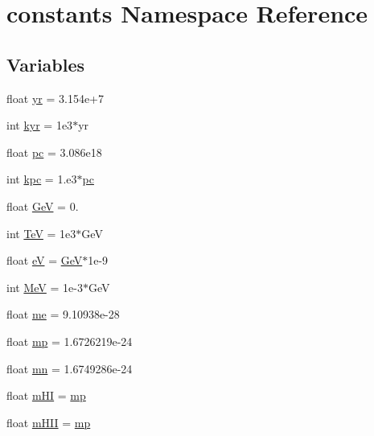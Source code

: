 \hypertarget{namespaceconstants}{}\section{constants Namespace Reference}
\label{namespaceconstants}
\subsection*{Variables}
\begin{DoxyCompactItemize}
\item 
float \hyperlink{namespaceconstants_a14d775b1c17d869c0f0d447f0bfc9330}{yr} = 3.\+154e+7
\item 
int \hyperlink{namespaceconstants_ab5bb5ac138ecb54ccd663804b1c3ab9c}{kyr} = 1e3$\ast$yr
\item 
float \hyperlink{namespaceconstants_a93c63f6ed8c5e300d378f5e4007f9b6d}{pc} = 3.\+086e18
\item 
int \hyperlink{namespaceconstants_ad91def68fa6a3afee415cc69061a7583}{kpc} = 1.e3$\ast$\hyperlink{namespaceconstants_a93c63f6ed8c5e300d378f5e4007f9b6d}{pc}
\item 
float \hyperlink{namespaceconstants_ae15025e47a0397f98ad31918b0c426d4}{GeV} = 0.
\item 
int \hyperlink{namespaceconstants_acfeca3926802be06862b690861b75547}{TeV} = 1e3$\ast$\+GeV
\item 
float \hyperlink{namespaceconstants_a93953cf99166a4a0b70cf2daf5d08be5}{eV} = \hyperlink{namespaceconstants_ae15025e47a0397f98ad31918b0c426d4}{GeV}$\ast$1e-\/9
\item 
int \hyperlink{namespaceconstants_a833162acb0cb16acebd5e3379bb4ab4d}{MeV} = 1e-\/3$\ast$\+GeV
\item 
float \hyperlink{namespaceconstants_a5103d84ddd0c3eff4199593db0a5d88d}{me} = 9.\+10938e-\/28
\item 
float \hyperlink{namespaceconstants_aebdc70445dfb9e72960792ba2efe97ab}{mp} = 1.\+6726219e-\/24
\item 
float \hyperlink{namespaceconstants_ad53f198771c37114065171d857217e26}{mn} = 1.\+6749286e-\/24
\item 
float \hyperlink{namespaceconstants_a7eb320ffb8626bac1462d41ac52f4938}{m\+HI} = \hyperlink{namespaceconstants_aebdc70445dfb9e72960792ba2efe97ab}{mp}
\item 
float \hyperlink{namespaceconstants_a8529868bbaabd3d0324f40286633083c}{m\+H\+II} = \hyperlink{namespaceconstants_aebdc70445dfb9e72960792ba2efe97ab}{mp}
\item 

\end{DoxyCompactItemize}
